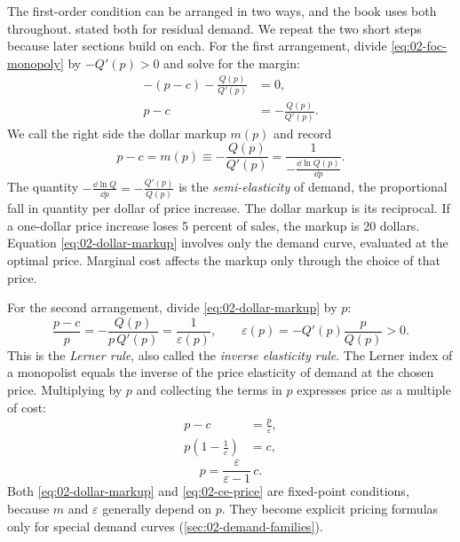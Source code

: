 The first-order condition can be arranged in two ways, and the book uses both throughout. 
stated both for residual demand. We repeat the two short steps because later sections build on each. For the first
arrangement, divide \eqref{eq:02-foc-monopoly} by $-Q'(p) > 0$ and solve for the margin:
\begin{align*}
  -(p - c) - \frac{Q(p)}{Q'(p)} &= 0, \\
  p - c &= -\frac{Q(p)}{Q'(p)} .
\end{align*}
We call the right side the dollar markup $m(p)$ and record
\begin{equation}\label{eq:02-dollar-markup}
  p - c = m(p) \equiv -\frac{Q(p)}{Q'(p)} = \frac{1}{-\frac{\dd \ln Q(p)}{\dd p}} .
\end{equation}
The quantity $-\frac{\dd \ln Q}{\dd p} = -\frac{Q'(p)}{Q(p)}$ is the \emph{semi-elasticity} of demand, the
proportional fall in quantity per dollar of price increase. The dollar markup is its reciprocal. If a one-dollar
price increase loses 5 percent of sales, the markup is 20 dollars. Equation \eqref{eq:02-dollar-markup} involves
only the demand curve, evaluated at the optimal price. Marginal cost affects the markup only through the choice of
that price.

For the second arrangement, divide \eqref{eq:02-dollar-markup} by $p$:
\begin{equation}\label{eq:02-lerner}
  \frac{p - c}{p} = -\frac{Q(p)}{p\,Q'(p)} = \frac{1}{\varepsilon(p)}, \qquad
  \varepsilon(p) = -Q'(p)\frac{p}{Q(p)} > 0 .
\end{equation}
This is the \emph{Lerner rule}, also called the \emph{inverse elasticity rule}. The Lerner index of a monopolist
equals the inverse of the price elasticity of demand at the chosen price. Multiplying by $p$ and collecting the
terms in $p$ expresses price as a multiple of cost:
\begin{align*}
  p - c &= \frac{p}{\varepsilon}, \\
  p\left(1 - \frac{1}{\varepsilon}\right) &= c,
\end{align*}
\begin{equation}\label{eq:02-ce-price}
  p = \frac{\varepsilon}{\varepsilon - 1}\,c .
\end{equation}
Both \eqref{eq:02-dollar-markup} and \eqref{eq:02-ce-price} are fixed-point conditions, because $m$ and
$\varepsilon$ generally depend on $p$. They become explicit pricing formulas only for special demand curves
(\cref{sec:02-demand-families}).

